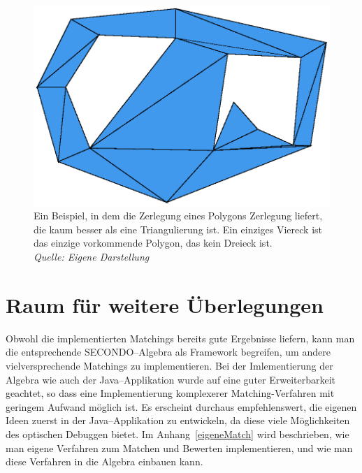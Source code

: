 \begin{figure}
	\centering
	\includegraphics[scale=0.9]{Convexer.svg.eps}
	\caption[Zerlegung eines Polygons, nur wenig besser als eine Triangulierung]{Ein Beispiel, in dem die Zerlegung eines Polygons Zerlegung liefert, die kaum besser als eine Triangulierung ist. Ein einziges Viereck ist das einzige vorkommende Polygon, das kein Dreieck ist.\\\textit{Quelle: Eigene Darstellung}}
	\label{fig:ZerlegungFace2}
\end{figure}

\section*{Raum für weitere Überlegungen}

Obwohl die implementierten Matchings bereits gute Ergebnisse liefern, kann man die entsprechende SECONDO--Algebra als Framework begreifen, um andere vielversprechende Matchings zu implementieren. Bei der Imlementierung der Algebra wie auch der Java--Applikation wurde auf eine guter Erweiterbarkeit geachtet, so dass eine Implementierung komplexerer Matching-Verfahren mit geringem Aufwand möglich ist. Es erscheint durchaus empfehlenswert, die eigenen Ideen zuerst in der Java--Applikation zu entwickeln, da diese viele Möglichkeiten des optischen Debuggen bietet. Im Anhang~\vref{eigeneMatch} wird beschrieben, wie man eigene Verfahren zum Matchen und Bewerten  implementieren, und wie man diese Verfahren in die Algebra einbauen kann.

